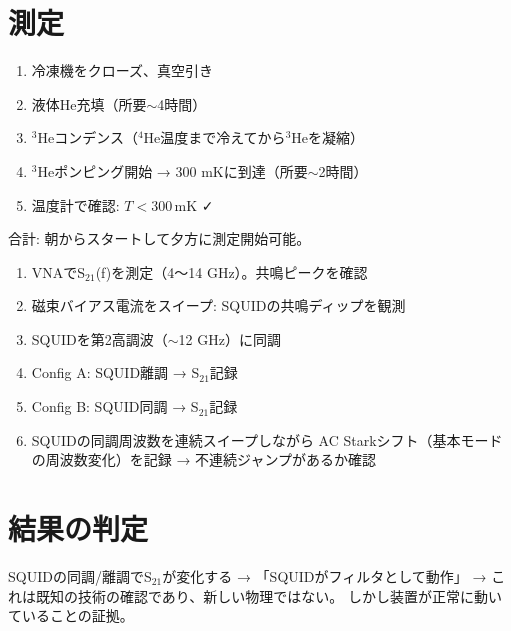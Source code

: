 \documentclass[12pt,a4paper]{article}
\begin{document}
\section{測定}

\begin{practicebox}[クールダウン]
\begin{enumerate}
\item 冷凍機をクローズ、真空引き
\item 液体He充填（所要$\sim$4時間）
\item $^3$Heコンデンス（$^4$He温度まで冷えてから$^3$Heを凝縮）
\item $^3$Heポンピング開始 → 300 mKに到達（所要$\sim$2時間）
\item 温度計で確認: $T < 300\,\mathrm{mK}$ ✓
\end{enumerate}
合計: 朝からスタートして夕方に測定開始可能。
\end{practicebox}

\begin{practicebox}[測定手順]
\begin{enumerate}
\item VNAでS$_{21}$(f)を測定（4〜14 GHz）。共鳴ピークを確認
\item 磁束バイアス電流をスイープ: SQUIDの共鳴ディップを観測
\item SQUIDを第2高調波（$\sim$12 GHz）に同調
\item Config A: SQUID離調 → S$_{21}$記録
\item Config B: SQUID同調 → S$_{21}$記録
\item SQUIDの同調周波数を連続スイープしながら
  AC Starkシフト（基本モードの周波数変化）を記録
  → 不連続ジャンプがあるか確認
\end{enumerate}
\end{practicebox}

\section{結果の判定}

\begin{theorybox}
SQUIDの同調/離調でS$_{21}$が変化する → 「SQUIDがフィルタとして動作」
→ これは既知の技術の確認であり、新しい物理ではない。
しかし装置が正常に動いていることの証拠。
\end{theorybox}
\end{document}
